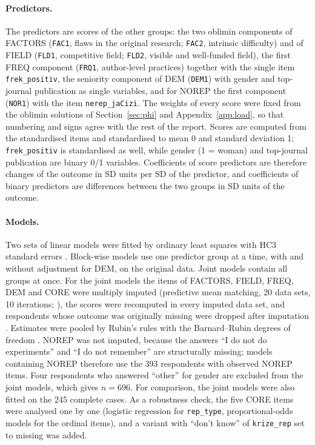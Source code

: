 \documentclass[11pt,a4paper]{article}
\newcommand{\var}[1]{\texttt{#1}}
\begin{document}
\paragraph{Predictors.}
The predictors are scores of the other groups: the two oblimin components of FACTORS (\var{FAC1}, flaws in the original research; \var{FAC2}, intrinsic difficulty) and of FIELD (\var{FLD1}, competitive field; \var{FLD2}, visible and well-funded field), the first FREQ component (\var{FRQ1}, author-level practices) together with the single item \var{frek\_positiv}, the seniority component of DEM (\var{DEM1}) with gender and top-journal publication as single variables, and for NOREP the first component (\var{NOR1}) with the item \var{nerep\_jaCizi}. The weights of every score were fixed from the oblimin solutions of Section~\ref{sec:phi} and Appendix~\ref{app:load}, so that numbering and signs agree with the rest of the report. Scores are computed from the standardised items and standardised to mean 0 and standard deviation 1; \var{frek\_positiv} is standardised as well, while gender (1 = woman) and top-journal publication are binary 0/1 variables. Coefficients of score predictors are therefore changes of the outcome in SD units per SD of the predictor, and coefficients of binary predictors are differences between the two groups in SD units of the outcome.

\paragraph{Models.}
Two sets of linear models were fitted by ordinary least squares with HC3 standard errors \citep{long2000}. Block-wise models use one predictor group at a time, with and without adjustment for DEM, on the original data. Joint models contain all groups at once. For the joint models the items of FACTORS, FIELD, FREQ, DEM and CORE were multiply imputed (predictive mean matching, 20 data sets, 10 iterations; \citealp{vanbuuren2011}), the scores were recomputed in every imputed data set, and respondents whose outcome was originally missing were dropped after imputation \citep{vonhippel2007}. Estimates were pooled by Rubin's rules with the Barnard--Rubin degrees of freedom \citep{rubin1987,barnard1999}. NOREP was not imputed, because the answers ``I do not do experiments'' and ``I do not remember'' are structurally missing; models containing NOREP therefore use the 393 respondents with observed NOREP items. Four respondents who answered ``other'' for gender are excluded from the joint models, which gives $n=696$. For comparison, the joint models were also fitted on the 245 complete cases. As a robustness check, the five CORE items were analysed one by one (logistic regression for \var{rep\_type}, proportional-odds models for the ordinal items), and a variant with ``don't know'' of \var{krize\_rep} set to missing was added.
\end{document}
